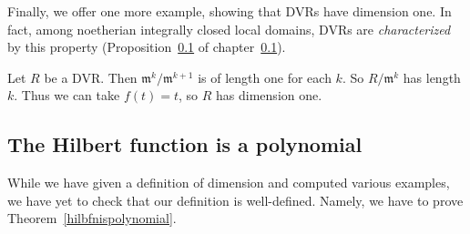 Finally, we offer one more example, showing that DVRs have dimension one. In
fact, among noetherian integrally closed local domains, DVRs are
\emph{characterized} by this property (Proposition~\ref{} of chapter~\ref{}).

\begin{example}
Let $R$ be a DVR. Then $\mathfrak{m}^k/\mathfrak{m}^{k+1}$ is of length one for
each $k$. So $R/\mathfrak{m}^k$ has length $k$. Thus we can take $f(t) = t$, so
$R$ has dimension one.
\end{example} 

\subsection{The Hilbert function is a polynomial} 

While we have given a definition of dimension and computed various examples,
we have yet to check that our definition is well-defined. 
Namely, we have to prove Theorem~\ref{hilbfnispolynomial}.


